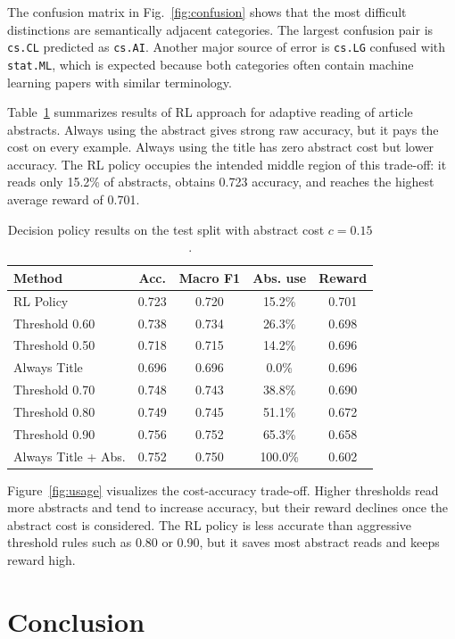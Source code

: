 \documentclass{article}
\begin{document}
The confusion matrix in Fig.~\ref{fig:confusion} shows that the most difficult distinctions are semantically adjacent categories. The largest confusion pair is \texttt{cs.CL} predicted as \texttt{cs.AI}. Another major source of error is \texttt{cs.LG} confused with \texttt{stat.ML}, which is expected because both categories often contain machine learning papers with similar terminology.

Table~\ref{tab:rl} summarizes results of RL approach for adaptive reading of article abstracts. Always using the abstract gives strong raw accuracy, but it pays the cost on every example. Always using the title has zero abstract cost but lower accuracy. The RL policy occupies the intended middle region of this trade-off: it reads only 15.2\% of abstracts, obtains 0.723 accuracy, and reaches the highest average reward of 0.701.

\begin{table}[tbh]
\centering
\small
\begin{tabular}{|l|c|c|c|c|}
\hline
Method & Acc. & Macro F1 & Abs. use & Reward \\
\hline
RL Policy & 0.723 & 0.720 & 15.2\% & 0.701 \\
Threshold 0.60 & 0.738 & 0.734 & 26.3\% & 0.698 \\
Threshold 0.50 & 0.718 & 0.715 & 14.2\% & 0.696 \\
Always Title & 0.696 & 0.696 & 0.0\% & 0.696 \\
Threshold 0.70 & 0.748 & 0.743 & 38.8\% & 0.690 \\
Threshold 0.80 & 0.749 & 0.745 & 51.1\% & 0.672 \\
Threshold 0.90 & 0.756 & 0.752 & 65.3\% & 0.658 \\
Always Title + Abs. & 0.752 & 0.750 & 100.0\% & 0.602 \\
\hline
\end{tabular}
\caption{Decision policy results on the test split with abstract cost \(c=0.15\).}
\label{tab:rl}
\end{table}

Figure~\ref{fig:usage} visualizes the cost-accuracy trade-off. Higher thresholds read more abstracts and tend to increase accuracy, but their reward declines once the abstract cost is considered. The RL policy is less accurate than aggressive threshold rules such as 0.80 or 0.90, but it saves most abstract reads and keeps reward high.

\section{Conclusion}
\end{document}
